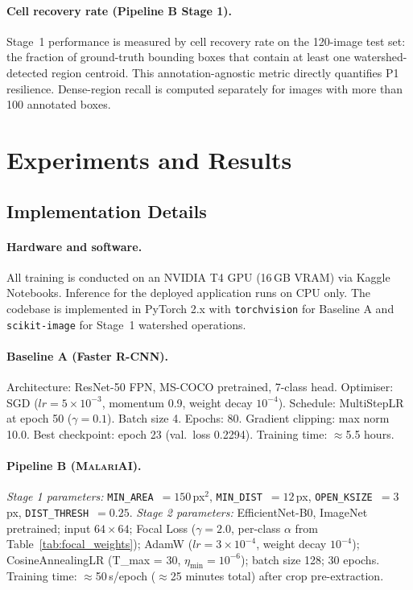 \documentclass[review,12pt]{elsarticle}
\newcommand{\malariai}{\textsc{MalariAI}}
\begin{document}
\paragraph{Cell recovery rate (Pipeline B Stage 1).}
Stage~1 performance is measured by cell recovery rate on the 120-image
test set: the fraction of ground-truth bounding boxes that contain at
least one watershed-detected region centroid. This annotation-agnostic
metric directly quantifies P1 resilience. Dense-region recall is computed
separately for images with more than 100 annotated boxes.

\section{Experiments and Results}
\label{sec:experiments}

\subsection{Implementation Details}
\label{ssec:impl}

\paragraph{Hardware and software.}
All training is conducted on an NVIDIA T4 GPU (16\,GB VRAM) via Kaggle
Notebooks. Inference for the deployed application runs on CPU only.
The codebase is implemented in PyTorch 2.x with \texttt{torchvision} for
Baseline A and \texttt{scikit-image} for Stage~1 watershed operations.

\paragraph{Baseline A (Faster R-CNN).}
Architecture: ResNet-50 FPN, MS-COCO pretrained, 7-class head. Optimiser:
SGD ($lr = 5 \times 10^{-3}$, momentum 0.9, weight decay $10^{-4}$).
Schedule: MultiStepLR at epoch 50 ($\gamma = 0.1$). Batch size 4. Epochs:
80. Gradient clipping: max norm 10.0. Best checkpoint: epoch 23
(val.\ loss 0.2294). Training time: $\approx$5.5 hours.

\paragraph{Pipeline B (\malariai{}).}
\textit{Stage 1 parameters:} \texttt{MIN\_AREA}~$= 150$\,px$^2$,
\texttt{MIN\_DIST}~$= 12$\,px, \texttt{OPEN\_KSIZE}~$= 3$\,px,
\texttt{DIST\_THRESH}~$= 0.25$.
\textit{Stage 2 parameters:} EfficientNet-B0, ImageNet pretrained; input
$64\times 64$; Focal Loss ($\gamma = 2.0$, per-class $\alpha$ from
Table~\ref{tab:focal_weights}); AdamW ($lr = 3 \times 10^{-4}$,
weight decay $10^{-4}$); CosineAnnealingLR (T\_max = 30,
$\eta_{\min} = 10^{-6}$); batch size 128; 30 epochs. Training time:
$\approx$50\,s/epoch ($\approx$25 minutes total) after crop pre-extraction.
\end{document}
